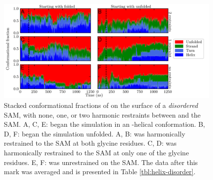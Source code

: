 \begin{figure}
    \center
    \includegraphics[width=6.0in]{figures-helix/disordered_helicity.png}
    \caption{
        Stacked conformational fractions of \pep{} on the surface of a \emph{disordered} SAM, with none, one, or two harmonic restraints between \pep{} and the SAM. 
        A, C, E: \pep{} began the simulation in an \textalpha{}-helical conformation. 
        B, D, F: \pep{} began the simulation unfolded. 
        A, B: \pep{} was harmonically restrained to the SAM at both glycine residues. 
        C, D: \pep{} was harmonically restrained to the SAM at only one of the glycine residues. 
        E, F: \pep{} was unrestrained on the SAM. 
        The data after this mark was averaged and is presented in Table \ref{tbl:helix-disorder}. 
    }
    \label{fig:helix-disorder}
\end{figure}

\begin{table}
    \caption{Average conformational fractions from simulations of \pep{} on the surface of a \emph{disordered} SAM in which either none, one, or both of the glycine residues in the peptide are harmonically restrained to the SAM.}
    \begin{center}
    \end{center}
    \label{tbl:helix-disorder}
\end{table}

